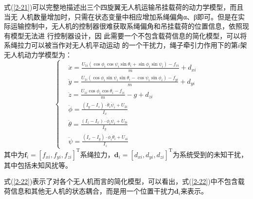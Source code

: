 式(\ref{2-21})可以完整地描述出三个四旋翼无人机运输吊挂载荷的动力学模型，而且当无
人机数量增加时，只需在状态变量中相应增加系绳偏角α、β即可。但是在实际运输控制中，无人机的控制器很难获取系绳偏角和吊挂载荷的位置信息，依照现有模型无法进
行控制器设计，因
此需要一个不包含载荷信息的简化模型，可以将系绳拉力可以被当作对无人机平动运动
的一个干扰力，绳子牵引力作用下的第$i$架无人机动力学模型为： 
\begin{equation}
	\left\{
	\begin{aligned}
		&\ddot{x}=\frac{U_{1i}\left(\cos\phi_i\cos\psi_i\sin\theta_i+\sin\phi_i\sin\psi_i\right)-f_{xi}}{m}+d_{xi}\\
		&\ddot{y}=\frac{U_{1i}\left(\cos\phi_i\sin\psi_i\sin\theta_i-\cos\psi_i\sin\phi_i\right)-f_{yi}}{m}+d_{yi}\\
		&\ddot{z}=\frac{U_{1i}\cos\phi_i\cos\theta_i-f_{zi}}{m}-g+d_{zi}\\
		&\ddot{\phi}=\frac{(I_{y}-I_{z})\cdot \dot{\theta}_i\dot{\psi}_i+U_{2i}}{I_{x}}\\
		&\ddot{\theta}=\frac{(I_{z}-I_{x})\cdot \dot{\phi}_i\dot{\psi}_i+U_{3i}}{I_{y}}\\
		&\ddot{\psi}=\frac{(I_{x}-I_{y})\cdot \dot{\phi}_i\dot{\theta}_i+U_{4i}}{I_{z}}\end{aligned}
	\right.
	\label{2-22}
\end{equation}
其中为$\boldsymbol{f}_{i}=
\left[f_{xi} , f_{yi} , f_{zi}\right]^\mathrm{T}$系绳拉力，$\bm d_i=\left[d_{xi},d_{yi},d_{zi}\right]^\mathrm{T}$为系统受到的未知干扰，其中包括未知风扰等。 

式(\ref{2-22})表示了对各个无人机而言的简化模型，可以看出，式(\ref{2-22})中不包含载荷信息和其他无人机的状态耦合，而是用一个位置干扰力$\boldsymbol{d}_{i}$来表示。